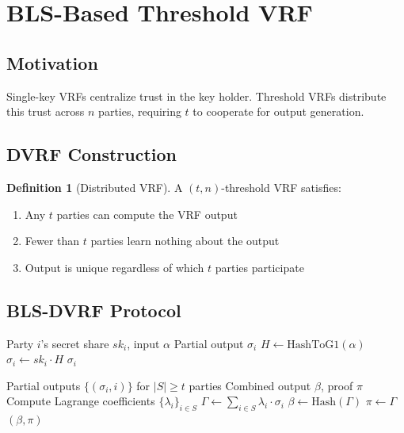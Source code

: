 \documentclass[11pt,a4paper]{article}
\theoremstyle{definition}
\newtheorem{definition}{Definition}
\begin{document}
\section{BLS-Based Threshold VRF}

\subsection{Motivation}

Single-key VRFs centralize trust in the key holder. Threshold VRFs distribute this trust across $n$ parties, requiring $t$ to cooperate for output generation.

\subsection{DVRF Construction}

\begin{definition}[Distributed VRF]
A $(t, n)$-threshold VRF satisfies:
\begin{enumerate}
    \item Any $t$ parties can compute the VRF output
    \item Fewer than $t$ parties learn nothing about the output
    \item Output is unique regardless of which $t$ parties participate
\end{enumerate}
\end{definition}

\subsection{BLS-DVRF Protocol}

\begin{algorithm}
\caption{BLS-DVRF Partial Evaluation}
\begin{algorithmic}[1]
\Require Party $i$'s secret share $sk_i$, input $\alpha$
\Ensure Partial output $\sigma_i$
\State $H \gets \text{HashToG1}(\alpha)$
\State $\sigma_i \gets sk_i \cdot H$
\Return $\sigma_i$
\end{algorithmic}
\end{algorithm}

\begin{algorithm}
\caption{BLS-DVRF Combine}
\begin{algorithmic}[1]
\Require Partial outputs $\{(\sigma_i, i)\}$ for $|S| \geq t$ parties
\Ensure Combined output $\beta$, proof $\pi$
\State Compute Lagrange coefficients $\{\lambda_i\}_{i \in S}$
\State $\Gamma \gets \sum_{i \in S} \lambda_i \cdot \sigma_i$
\State $\beta \gets \text{Hash}(\Gamma)$
\State $\pi \gets \Gamma$
\Return $(\beta, \pi)$
\end{algorithmic}
\end{algorithm}
\end{document}
